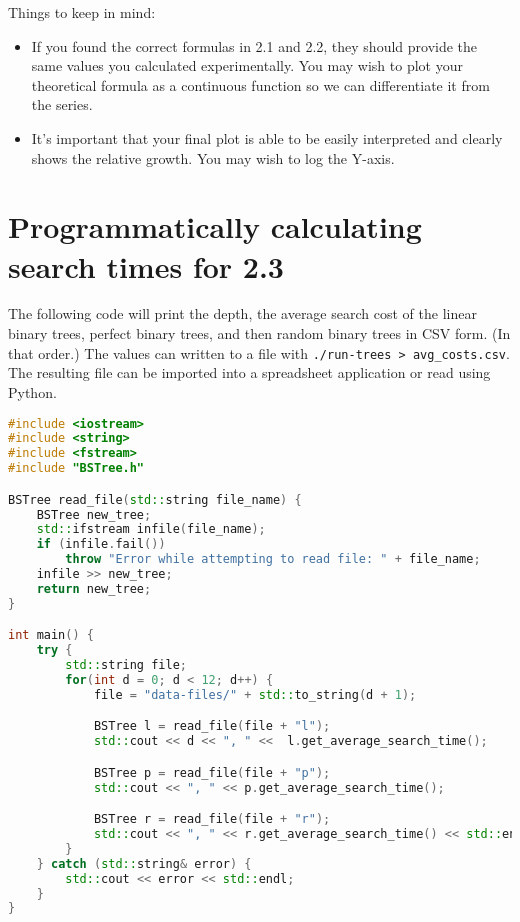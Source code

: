 \documentclass{article}
\begin{document}
\bigskip

\noindent Things to keep in mind:
\begin{itemize}
    \item If you found the correct formulas in 2.1 and 2.2, they should provide the same values you calculated experimentally. You may wish to plot your theoretical formula as a continuous function so we can differentiate it from the series.
    \item It's important that your final plot is able to be easily interpreted and clearly shows the relative growth. You may wish to log the Y-axis.
\end{itemize}

\newpage

\section*{Programmatically calculating search times for 2.3}

The following code will print the depth, the average search cost of the linear binary trees, perfect binary trees, and then random binary trees in CSV form. (In that order.) The values can written to a file with \verb|./run-trees > avg_costs.csv|. The resulting file can be imported into a spreadsheet application or read using Python.

\begin{lstlisting}[language=c++]
#include <iostream>
#include <string>
#include <fstream>
#include "BSTree.h"

BSTree read_file(std::string file_name) {      
    BSTree new_tree;
    std::ifstream infile(file_name); 
    if (infile.fail())
        throw "Error while attempting to read file: " + file_name;
    infile >> new_tree;
    return new_tree;
}

int main() {
    try {
        std::string file;
        for(int d = 0; d < 12; d++) {
            file = "data-files/" + std::to_string(d + 1);

            BSTree l = read_file(file + "l");
            std::cout << d << ", " <<  l.get_average_search_time();

            BSTree p = read_file(file + "p");
            std::cout << ", " << p.get_average_search_time();

            BSTree r = read_file(file + "r");
            std::cout << ", " << r.get_average_search_time() << std::endl;
        }
    } catch (std::string& error) {
        std::cout << error << std::endl;
    }
}
\end{lstlisting}
\end{document}

